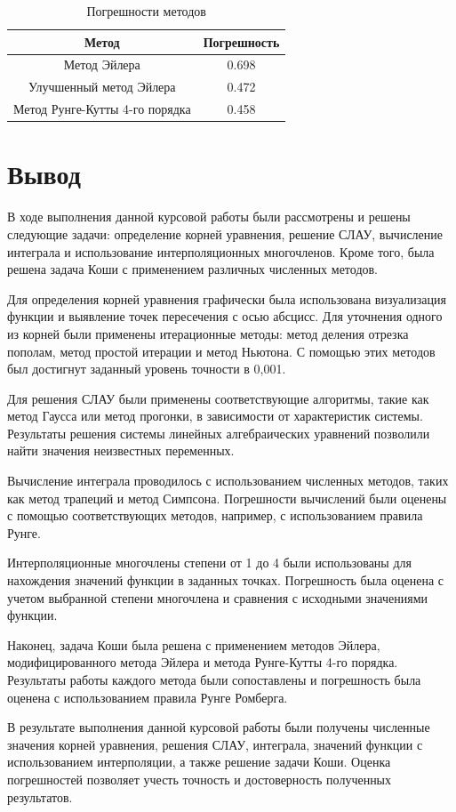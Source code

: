 \documentclass[12pt]{article}
\begin{document}
    \begin{table}[h]
        \centering
        \caption{Погрешности методов}
        \begin{tabular}{|c|c|}
            \hline
            \textbf{Метод}                 & \textbf{Погрешность} \\
            \hline
            Метод Эйлера                   & 0.698                \\
            \hline
            Улучшенный метод Эйлера        & 0.472                \\
            \hline
            Метод Рунге-Кутты 4-го порядка & 0.458                \\
            \hline
        \end{tabular}
    \end{table}


    \section{Вывод}

    В ходе выполнения данной курсовой работы были рассмотрены и решены следующие задачи: определение корней уравнения, решение СЛАУ, вычисление интеграла и использование интерполяционных многочленов. Кроме того, была решена задача Коши с применением различных численных методов.

    Для определения корней уравнения графически была использована визуализация функции и выявление точек пересечения с осью абсцисс. Для уточнения одного из корней были применены итерационные методы: метод деления отрезка пополам, метод простой итерации и метод Ньютона. С помощью этих методов был достигнут заданный уровень точности в 0,001.

    Для решения СЛАУ были применены соответствующие алгоритмы, такие как метод Гаусса или метод прогонки, в зависимости от характеристик системы. Результаты решения системы линейных алгебраических уравнений позволили найти значения неизвестных переменных.

    Вычисление интеграла проводилось с использованием численных методов, таких как метод трапеций и метод Симпсона. Погрешности вычислений были оценены с помощью соответствующих методов, например, с использованием правила Рунге.

    Интерполяционные многочлены степени от 1 до 4 были использованы для нахождения значений функции в заданных точках. Погрешность была оценена с учетом выбранной степени многочлена и сравнения с исходными значениями функции.

    Наконец, задача Коши была решена с применением методов Эйлера, модифицированного метода Эйлера и метода Рунге-Кутты 4-го порядка. Результаты работы каждого метода были сопоставлены и погрешность была оценена с использованием правила Рунге Ромберга.

    В результате выполнения данной курсовой работы были получены численные значения корней уравнения, решения СЛАУ, интеграла, значений функции с использованием интерполяции, а также решение задачи Коши. Оценка погрешностей позволяет учесть точность и достоверность полученных результатов.
\end{document}
